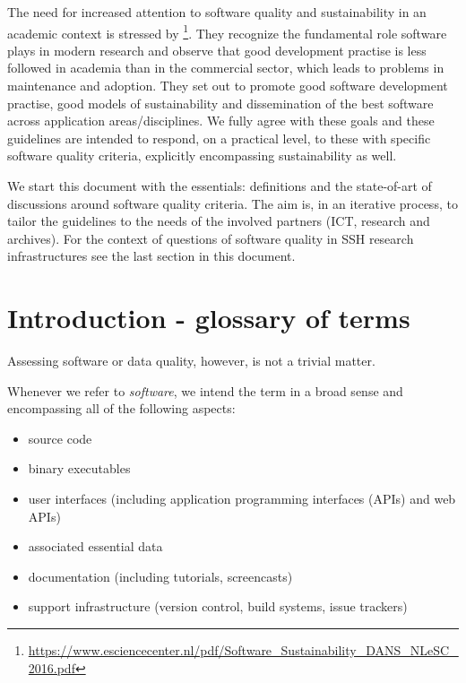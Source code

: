 \documentclass[a4paper,11pt]{article}
\begin{document}
The need for increased attention to software quality and sustainability in an
academic context is stressed by
\cite{RESEARCHSOFTWARE}\footnote{\url{https://www.esciencecenter.nl/pdf/Software_Sustainability_DANS_NLeSC_2016.pdf}}.
They recognize the fundamental role software plays in modern research and
observe that good development practise is less followed in academia than in the
commercial sector, which leads to problems in maintenance and adoption. They
set out to promote good software development practise, good models of
sustainability and dissemination of the best software across application
areas/disciplines. We fully agree with these goals and these guidelines are
intended to respond, on a practical level, to these with specific software
quality criteria, explicitly encompassing sustainability as well.

We start this document with the essentials: definitions and the state-of-art
of discussions around software quality criteria. The aim is, in an iterative
process, to tailor the guidelines to the needs of the involved partners (ICT,
research and archives). For the context of questions of software quality in SSH
research infrastructures see the last section in this document.

\section{Introduction - glossary of terms}

Assessing software or data quality, however, is not a trivial matter. 

Whenever we refer to \emph{software}, we intend the term in a broad sense and
encompassing all of the following aspects:
\begin{itemize}
    \item source code
    \item binary executables
    \item user interfaces (including application programming interfaces (APIs) and web APIs)
    \item associated essential data
%
%
%
    \item documentation (including tutorials, screencasts)
    \item support infrastructure (version control, build systems, issue trackers)
\end{itemize}
\end{document}
